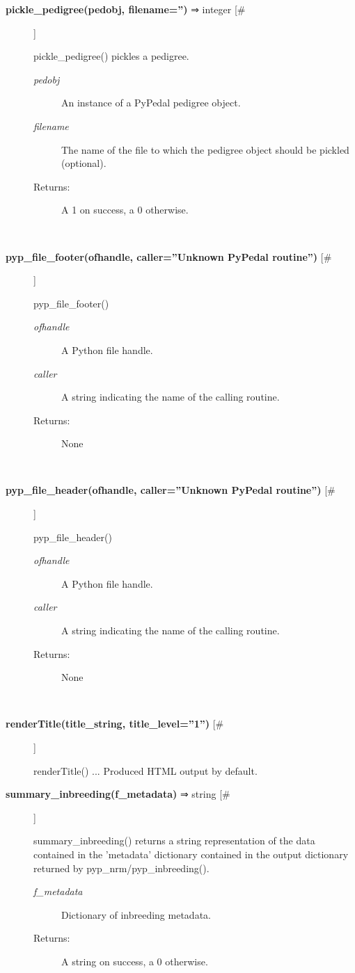 \begin{description}
\item[\textbf{pickle\_pedigree(pedobj, filename='')}
 ⇒ integer [\#]]

 pickle\_pedigree() pickles a pedigree.
\begin{description}
\item[\emph{pedobj}
] An instance of a PyPedal pedigree object.
\item[\emph{filename}
] The name of the file to which the pedigree object should be pickled (optional).
\item[Returns:] A 1 on success, a 0 otherwise.

\end{description}
\\ 

\item[\textbf{pyp\_file\_footer(ofhandle, caller=''Unknown PyPedal routine'')}
 [\#]]

 pyp\_file\_footer()
\begin{description}
\item[\emph{ofhandle}
] A Python file handle.
\item[\emph{caller}
] A string indicating the name of the calling routine.
\item[Returns:] None

\end{description}
\\ 

\item[\textbf{pyp\_file\_header(ofhandle, caller=''Unknown PyPedal routine'')}
 [\#]]

 pyp\_file\_header()
\begin{description}
\item[\emph{ofhandle}
] A Python file handle.
\item[\emph{caller}
] A string indicating the name of the calling routine.
\item[Returns:] None

\end{description}
\\ 

\item[\textbf{renderTitle(title\_string, title\_level=''1'')}
 [\#]]

 renderTitle() ... Produced HTML output by default.

\item[\textbf{summary\_inbreeding(f\_metadata)}
 ⇒ string [\#]]

 summary\_inbreeding() returns a string representation of the data contained in the 'metadata' dictionary contained in the output dictionary returned by pyp\_nrm/pyp\_inbreeding().
\begin{description}
\item[\emph{f\_metadata}
] Dictionary of inbreeding metadata.
\item[Returns:] A string on success, a 0 otherwise.


\end{description}
\end{description}
